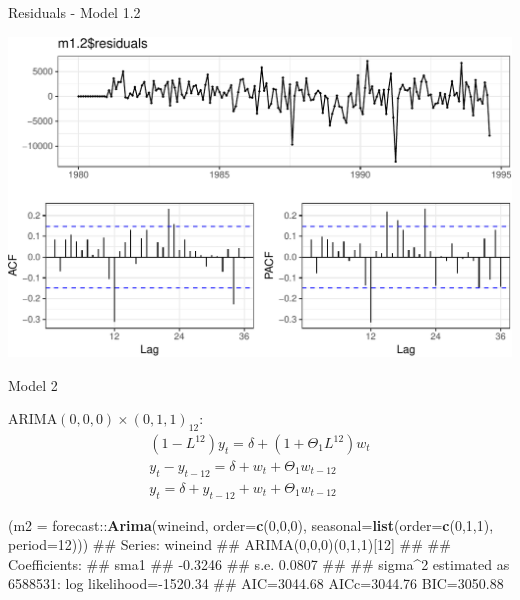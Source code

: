\documentclass[11pt,ignorenonframetext,]{beamer}
\newenvironment{Shaded}{}{}
\newcommand{\DataTypeTok}[1]{\textcolor[rgb]{0.56,0.13,0.00}{#1}}
\newcommand{\DecValTok}[1]{\textcolor[rgb]{0.25,0.63,0.44}{#1}}
\newcommand{\KeywordTok}[1]{\textcolor[rgb]{0.00,0.44,0.13}{\textbf{#1}}}
\newcommand{\NormalTok}[1]{#1}
\newcommand{\OperatorTok}[1]{\textcolor[rgb]{0.40,0.40,0.40}{#1}}
\let\oldShaded\Shaded
\let\endoldShaded\endShaded
\renewenvironment{Shaded}{\footnotesize\begin{spacing}{0.9}\oldShaded}{\endoldShaded\end{spacing}}
\begin{document}
\begin{frame}{%
\protect\hypertarget{residuals---model-1.2}{%
Residuals - Model 1.2}}

\begin{center}\includegraphics[width=\textwidth]{Lec11_files/figure-beamer/unnamed-chunk-8-1} \end{center}

\end{frame}

\begin{frame}[fragile]{%
\protect\hypertarget{model-2}{%
Model 2}}

\(\text{ARIMA}(0,0,0) \times (0,1,1)_{12}\): \[
\begin{aligned}
(1-L^{12}) y_t = \delta + (1+\Theta_1 L^{12})  w_t \\
y_t-y_{t-12} = \delta + w_t + \Theta_1 w_{t-12} \\
y_t = \delta + y_{t-12} + w_t + \Theta_1 w_{t-12}
\end{aligned}
\]

\begin{Shaded}
\begin{Highlighting}[]
\NormalTok{(}\DataTypeTok{m2 =}\NormalTok{ forecast}\OperatorTok{::}\KeywordTok{Arima}\NormalTok{(wineind, }\DataTypeTok{order=}\KeywordTok{c}\NormalTok{(}\DecValTok{0}\NormalTok{,}\DecValTok{0}\NormalTok{,}\DecValTok{0}\NormalTok{), }
                      \DataTypeTok{seasonal=}\KeywordTok{list}\NormalTok{(}\DataTypeTok{order=}\KeywordTok{c}\NormalTok{(}\DecValTok{0}\NormalTok{,}\DecValTok{1}\NormalTok{,}\DecValTok{1}\NormalTok{), }\DataTypeTok{period=}\DecValTok{12}\NormalTok{)))}
\NormalTok{## Series: wineind }
\NormalTok{## ARIMA(0,0,0)(0,1,1)[12] }
\NormalTok{## }
\NormalTok{## Coefficients:}
\NormalTok{##          sma1}
\NormalTok{##       -0.3246}
\NormalTok{## s.e.   0.0807}
\NormalTok{## }
\NormalTok{## sigma^2 estimated as 6588531:  log likelihood=-1520.34}
\NormalTok{## AIC=3044.68   AICc=3044.76   BIC=3050.88}
\end{Highlighting}
\end{Shaded}

\end{frame}
\end{document}
